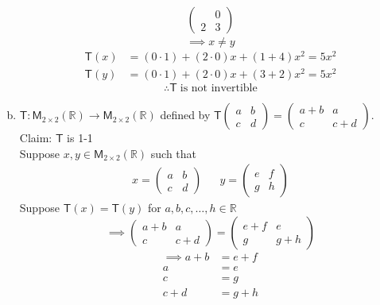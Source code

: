 \begin{enumerate}[(a)]
\begin{align}
\begin{pmatrix}
  & 0\\ 2 & 3\end{pmatrix}
\end{align}
\begin{equation}
\implies x \neq y
\end{equation}
\begin{align}
\mathsf{T}(x) &= (0\cdot 1) + (2\cdot 0) x + (1+4)x^2 = 5x^2\\
\mathsf{T}(y) &= (0\cdot 1) + (2\cdot 0) x + (3+2)x^2 = 5x^2
\end{align}
\begin{equation*}
\therefore \mathsf{T}\;\text{is not invertible}
\end{equation*}
\item $\mathsf{T}\colon \mathsf{M}_{2\times 2}(\mathbb{R}) \to
  \mathsf{M}_{2\times 2}(\mathbb{R})$ defined by $\mathsf{T}\begin{pmatrix}a&b\\c&d
  \end{pmatrix} = \begin{pmatrix} a+b& a\\ c & c+d
  \end{pmatrix}$.
\\Claim: $\mathsf{T}$ is 1-1
\\Suppose $x,y \in \mathsf{M}_{2\times 2}(\mathbb{R})$ such that
\begin{align}
x = \begin{pmatrix}a & b\\ c & d\end{pmatrix} & & y = \begin{pmatrix}e &
  f\\ g & h\end{pmatrix}
\end{align}
Suppose $\mathsf{T}(x) = \mathsf{T}(y)$ for $a,b,c,\dotsc,h \in
\mathbb{R}$
\begin{equation}
\implies 
\begin{pmatrix}
a+b & a \\
c & c +d 
\end{pmatrix}
=
\begin{pmatrix}
e +f & e \\
g & g + h
\end{pmatrix}
\end{equation}
\begin{align}
\implies a + b &= e + f \\
a &= e\\
c &= g\\
c + d &= g + h

\end{align}
\end{enumerate}
